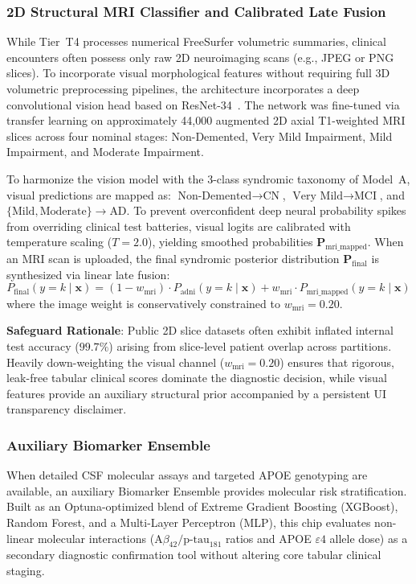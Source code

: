 \subsubsection{2D Structural MRI Classifier and Calibrated Late Fusion}
While Tier~T4 processes numerical FreeSurfer volumetric summaries, clinical encounters often possess only raw 2D neuroimaging scans (e.g., JPEG or PNG slices). To incorporate visual morphological features without requiring full 3D volumetric preprocessing pipelines, the architecture incorporates a deep convolutional vision head based on ResNet-34~\cite{he2016resnet}. The network was fine-tuned via transfer learning on approximately 44,000 augmented 2D axial T1-weighted MRI slices across four nominal stages: Non-Demented, Very Mild Impairment, Mild Impairment, and Moderate Impairment.

To harmonize the vision model with the 3-class syndromic taxonomy of Model~A, visual predictions are mapped as: $\text{Non-Demented} \to \text{CN}$, $\text{Very Mild} \to \text{MCI}$, and $\{\text{Mild}, \text{Moderate}\} \to \text{AD}$. To prevent overconfident deep neural probability spikes from overriding clinical test batteries, visual logits are calibrated with temperature scaling ($T = 2.0$), yielding smoothed probabilities $\mathbf{P}_{\text{mri\_mapped}}$. When an MRI scan is uploaded, the final syndromic posterior distribution $\mathbf{P}_{\text{final}}$ is synthesized via linear late fusion:
\begin{equation}
    P_{\text{final}}(y = k \mid \mathbf{x}) = (1 - w_{\text{mri}}) \cdot P_{\text{adni}}(y = k \mid \mathbf{x}) + w_{\text{mri}} \cdot P_{\text{mri\_mapped}}(y = k \mid \mathbf{x})
\end{equation}
where the image weight is conservatively constrained to $w_{\text{mri}} = 0.20$.

\textbf{Safeguard Rationale}: Public 2D slice datasets often exhibit inflated internal test accuracy ($99.7\%$) arising from slice-level patient overlap across partitions. Heavily down-weighting the visual channel ($w_{\text{mri}} = 0.20$) ensures that rigorous, leak-free tabular clinical scores dominate the diagnostic decision, while visual features provide an auxiliary structural prior accompanied by a persistent UI transparency disclaimer.

\subsubsection{Auxiliary Biomarker Ensemble}
When detailed CSF molecular assays and targeted APOE genotyping are available, an auxiliary Biomarker Ensemble provides molecular risk stratification. Built as an Optuna-optimized blend of Extreme Gradient Boosting (XGBoost), Random Forest, and a Multi-Layer Perceptron (MLP), this chip evaluates non-linear molecular interactions ($\text{A}\beta_{42}/\text{p-tau}_{181}$ ratios and APOE $\varepsilon4$ allele dose) as a secondary diagnostic confirmation tool without altering core tabular clinical staging.

